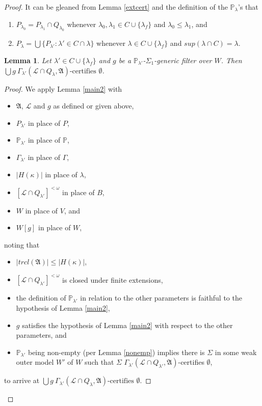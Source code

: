 \documentclass[12pt, twoside]{memoir}
\numberwithin{equation}{section}
\newtheorem{lem}[thm]{Lemma}
\theoremstyle{definition}
\theoremstyle{remark}
\theoremstyle{definition}
\theoremstyle{definition}
\theoremstyle{definition}
\theoremstyle{remark}
\begin{document}
\begin{proof}
It can be gleaned from Lemma \ref{extcert} and the definition of the $\mathbb{P}_{\lambda}$'s that
\begin{enumerate}[label=(P\arabic*), leftmargin=40pt]
    \item\label{p1} $P_{\lambda_0} = P_{\lambda_1} \cap Q_{\lambda_0}$ whenever $\lambda_0, \lambda_1 \in C \cup \{\lambda_f\}$ and $\lambda_0 \leq \lambda_1$, and
    \item\label{p2} $P_{\lambda} = \bigcup \{P_{\lambda'} : \lambda' \in C \cap \lambda\}$ whenever $\lambda \in C \cup \{\lambda_f\}$ and $sup(\lambda \cap C) = \lambda$.
\end{enumerate}

\begin{lem}\label{modeldone}
Let $\lambda' \in C \cup \{\lambda_f\}$ and $g$ be a $\mathbb{P}_{\lambda'}$-$\Sigma_1$-generic filter over $W$. Then $\bigcup g \ \Gamma_{\lambda'} (\mathcal{L} \cap Q_{\lambda}, \mathfrak{A}) \text{-certifies } \emptyset$.
\end{lem}

\begin{proof}
We apply Lemma \ref{main2} with 
\begin{itemize}
    \item $\mathfrak{A}$, $\mathcal{L}$ and $g$ as defined or given above,
    \item $P_{\lambda'}$ in place of $P$,
    \item $\mathbb{P}_{\lambda'}$ in place of $\mathbb{P}$, 
    \item $\Gamma_{\lambda'}$ in place of $\Gamma$,
    \item $|H(\kappa)|$ in place of $\lambda$,
    \item $[\mathcal{L} \cap Q_{\lambda'}]^{< \omega}$ in place of $B$,
    \item $W$ in place of $V$, and
    \item $W[g]$ in place of $W$,
\end{itemize}
noting that
\begin{itemize}
    \item $|trcl(\mathfrak{A})| \leq |H(\kappa)|$,
    \item $[\mathcal{L} \cap Q_{\lambda'}]^{< \omega}$ is closed under finite extensions,
    \item the definition of $\mathbb{P}_{\lambda'}$ in relation to the other parameters is faithful to the hypothesis of Lemma \ref{main2},
    \item $g$ satisfies the hypothesis of Lemma \ref{main2} with respect to the other parameters, and
    \item $\mathbb{P}_{\lambda'}$ being non-empty (per Lemma \ref{nonemp}) implies there is $\Sigma$ in some weak outer model $W'$ of $W$ such that $\Sigma$ $\Gamma_{\lambda'} (\mathcal{L} \cap Q_{\lambda'}, \mathfrak{A})$-certifies $\emptyset$,
\end{itemize}
to arrive at $\bigcup g \ \Gamma_{\lambda'} (\mathcal{L} \cap Q_{\lambda}, \mathfrak{A}) \text{-certifies } \emptyset$.
\end{proof}


\end{proof}
\end{document}
